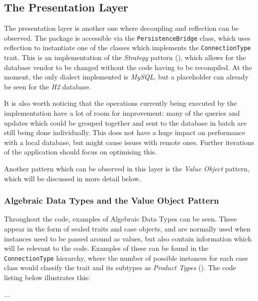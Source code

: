 \subsection{The Presentation Layer}

The presentation layer is another one where decoupling and reflection can be
observed. The package is accessible via the \texttt{PersistenceBridge} class,
which uses reflection to instantiate one of the classes which implements the
\texttt{ConnectionType} trait. This is an implementation of the \emph{Strategy}
pattern (\cite[][p.~80]{lokke2009scala}), which allows for the database vendor
to be changed without the code having to be recompiled. At the moment, the only
dialect implemented is \emph{MySQL}, but a placeholder can already be seen for
the \emph{H2} database.

It is also worth noticing that the operations currently being executed by the
implementation have a lot of room for improvement: many of the queries and
updates which could be grouped together and sent to the database in batch are
still being done individually. This does not have a huge impact on performance
with a local database, but might cause issues with remote ones. Further
iterations of the application should focus on optimising this.

Another pattern which can be observed in this layer is the \emph{Value Object}
pattern, which will be discussed in more detail below.

\subsubsection{Algebraic Data Types and the Value Object Pattern} \label{sec:Implementation.ADTAndValueObject}
Throughout the code, examples of Algebraic Data Types can be seen. These appear
in the form of sealed traits and case objects, and are normally used when
instances need to be passed around as values, but also contain information which will
be relevant to the code. Examples of these can be found in the
\texttt{ConnectionType} hierarchy, where the number of possible instances for
each case class would classify the trait and its subtypes as \emph{Product
Types} (\cite[][p.~411]{wampler2015programming}). The code listing below
illustrates this:

{
  \small
  
}
...

